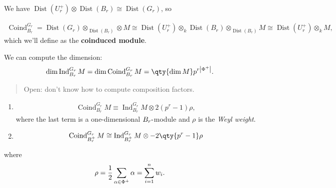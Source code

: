 We have
\(\operatorname{Dist}(U_r^+) \otimes\operatorname{Dist}(B_r) \cong \operatorname{Dist}(G_r)\),
so

\begin{align*}   \operatorname{Coind}_{B_r}^{G_r} = \operatorname{Dist}(G_r) \otimes_{\operatorname{Dist}(B_r)} \otimes M \cong \operatorname{Dist}(U_r^+) \otimes_k \operatorname{Dist}(B_r) \otimes_{\operatorname{Dist}(B_r)} M  \cong \operatorname{Dist}(U_r^+) \otimes_k M ,\end{align*}
which we'll define as the \textbf{coinduced module}.

We can compute the dimension:
\begin{align*}   \dim \operatorname{Ind}_{B_r}^{G_r} M = \dim \operatorname{Coind}_{B_r}^{G_r} M = \qty{\dim M} p^{r{\left\lvert {\Phi^+} \right\rvert}} .\end{align*}

\begin{quote}
Open: don't know how to compute composition factors.
\end{quote}

\begin{proposition}[?]

\begin{proposition}[?]

\hfill

\begin{enumerate}
\def\labelenumi{\arabic{enumi}.}
\item
  \begin{align*}\operatorname{Coind}_{B_r}^{G_r} M \equiv \operatorname{Ind}_{B_r}^{G_r} M\otimes 2(p^r - 1)\rho,\end{align*}
  where the last term is a one-dimensional \(B_r{\hbox{-}}\)module and
  \(\rho\) is the \emph{Weyl weight}.
\item
  \begin{align*}\operatorname{Coind}_{B_r^+}^{G_r} M \cong \operatorname{Ind}_{B_r^+}^{G_r} M \otimes-2\qty{p^r-1}\rho\end{align*}
\end{enumerate}

where
\begin{align*}   \rho = {1\over 2}\sum_{\alpha\in\Phi^+} \alpha = \sum_{i=1}^n w_i .\end{align*}

\end{proposition}

\end{proposition}

